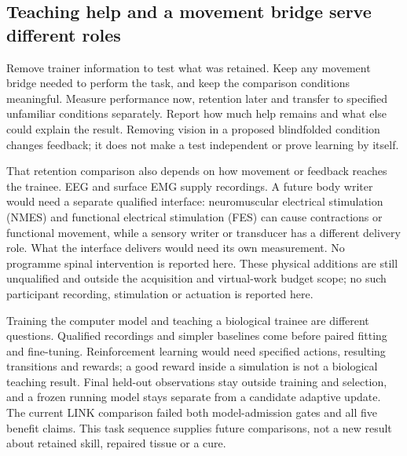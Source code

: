 \subsection{Teaching help and a movement bridge serve different roles}

Remove trainer information to test what was retained. Keep any movement bridge
needed to perform the task, and keep the comparison conditions meaningful.
Measure performance now, retention later and transfer to specified unfamiliar
conditions separately. Report how much help remains and what else could explain
the result. Removing vision in a proposed blindfolded condition changes feedback;
it does not make a test independent or prove learning by itself.

That retention comparison also depends on how movement or feedback reaches the
trainee. EEG and surface EMG supply recordings. A future body writer would need
a separate qualified interface: neuromuscular electrical stimulation (NMES)
and functional electrical stimulation (FES) can cause contractions or functional
movement, while a sensory writer or transducer has a different delivery role.
What the interface delivers would need its own measurement. No programme spinal intervention is reported here. These physical additions are still unqualified and
outside the acquisition and virtual-work budget scope; no such participant
recording, stimulation or actuation is reported here.

Training the computer model and teaching a biological trainee are different
questions. Qualified recordings and simpler baselines come before paired fitting
and fine-tuning. Reinforcement learning would need specified actions, resulting
transitions and rewards; a good reward inside a simulation is not a biological
teaching result. Final held-out observations stay outside training and selection,
and a frozen running model stays separate from a candidate adaptive update. The
current LINK comparison failed both model-admission gates and all five benefit
claims. This task sequence supplies future comparisons, not a new result about
retained skill, repaired tissue or a cure.
